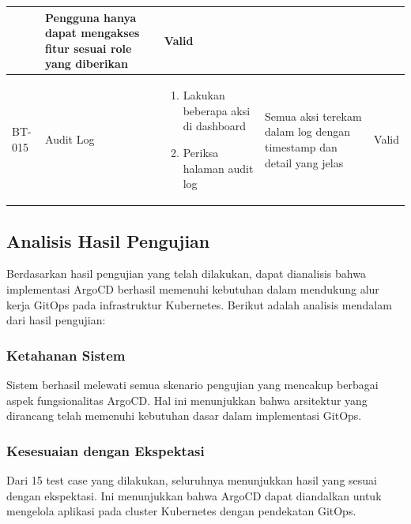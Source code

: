 \begin{table}[H]
\begin{adjustbox}{width=\textwidth}
\begin{tabular}{|p{0.8cm}|p{2.2cm}|p{4cm}|p{3.5cm}|p{1.2cm}|}
\begin{enumerate}[leftmargin=*,noitemsep,topsep=0pt,label=\arabic*.,widest=99]
                                                    \end{enumerate} & Pengguna hanya dapat mengakses fitur sesuai role yang diberikan     & Valid                                                                          \\ \hline
      BT-015            & Audit Log               & \begin{enumerate}[leftmargin=*,noitemsep,topsep=0pt,label=\arabic*.,widest=99]
                                                      \item Lakukan beberapa aksi di dashboard
                                                      \item Periksa halaman audit log
                                                    \end{enumerate} & Semua aksi terekam dalam log dengan timestamp dan detail yang jelas & Valid                                                                          \\ \hline
    \end{tabular}
  \end{adjustbox}
\end{table}

\subsection{Analisis Hasil Pengujian}\label{subsec:analisis_hasil}
Berdasarkan hasil pengujian yang telah dilakukan, dapat dianalisis bahwa implementasi ArgoCD berhasil memenuhi kebutuhan dalam mendukung alur kerja GitOps pada infrastruktur Kubernetes. Berikut adalah analisis mendalam dari hasil pengujian:

\subsubsection{Ketahanan Sistem}
Sistem berhasil melewati semua skenario pengujian yang mencakup berbagai aspek fungsionalitas ArgoCD. Hal ini menunjukkan bahwa arsitektur yang dirancang telah memenuhi kebutuhan dasar dalam implementasi GitOps.

\subsubsection{Kesesuaian dengan Ekspektasi}
Dari 15 test case yang dilakukan, seluruhnya menunjukkan hasil yang sesuai dengan ekspektasi. Ini menunjukkan bahwa ArgoCD dapat diandalkan untuk mengelola aplikasi pada cluster Kubernetes dengan pendekatan GitOps.

